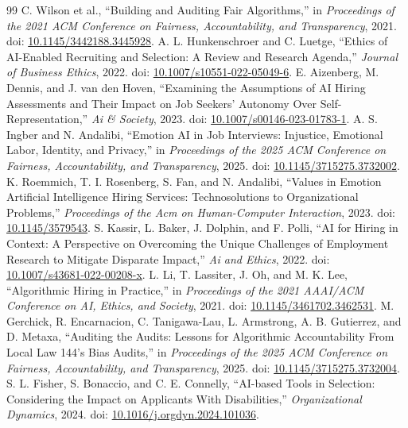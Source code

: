 \documentclass[journal]{IEEEtran}
\begin{document}
\begin{thebibliography}{99}
 C. Wilson et al., ``Building and Auditing Fair Algorithms,'' in \emph{Proceedings of the 2021 ACM Conference on Fairness, Accountability, and Transparency}, 2021. doi: \href{https://doi.org/10.1145/3442188.3445928}{10.1145/3442188.3445928}.
 A. L. Hunkenschroer and C. Luetge, ``Ethics of AI-Enabled Recruiting and Selection: A Review and Research Agenda,'' \emph{Journal of Business Ethics}, 2022. doi: \href{https://doi.org/10.1007/s10551-022-05049-6}{10.1007/s10551-022-05049-6}.
 E. Aizenberg, M. Dennis, and J. van den Hoven, ``Examining the Assumptions of AI Hiring Assessments and Their Impact on Job Seekers' Autonomy Over Self-Representation,'' \emph{Ai \& Society}, 2023. doi: \href{https://doi.org/10.1007/s00146-023-01783-1}{10.1007/s00146-023-01783-1}.
 A. S. Ingber and N. Andalibi, ``Emotion AI in Job Interviews: Injustice, Emotional Labor, Identity, and Privacy,'' in \emph{Proceedings of the 2025 ACM Conference on Fairness, Accountability, and Transparency}, 2025. doi: \href{https://doi.org/10.1145/3715275.3732002}{10.1145/3715275.3732002}.
 K. Roemmich, T. I. Rosenberg, S. Fan, and N. Andalibi, ``Values in Emotion Artificial Intelligence Hiring Services: Technosolutions to Organizational Problems,'' \emph{Proceedings of the Acm on Human-Computer Interaction}, 2023. doi: \href{https://doi.org/10.1145/3579543}{10.1145/3579543}.
 S. Kassir, L. Baker, J. Dolphin, and F. Polli, ``AI for Hiring in Context: A Perspective on Overcoming the Unique Challenges of Employment Research to Mitigate Disparate Impact,'' \emph{Ai and Ethics}, 2022. doi: \href{https://doi.org/10.1007/s43681-022-00208-x}{10.1007/s43681-022-00208-x}.
 L. Li, T. Lassiter, J. Oh, and M. K. Lee, ``Algorithmic Hiring in Practice,'' in \emph{Proceedings of the 2021 AAAI/ACM Conference on AI, Ethics, and Society}, 2021. doi: \href{https://doi.org/10.1145/3461702.3462531}{10.1145/3461702.3462531}.
 M. Gerchick, R. Encarnacion, C. Tanigawa-Lau, L. Armstrong, A. B. Gutierrez, and D. Metaxa, ``Auditing the Audits: Lessons for Algorithmic Accountability From Local Law 144's Bias Audits,'' in \emph{Proceedings of the 2025 ACM Conference on Fairness, Accountability, and Transparency}, 2025. doi: \href{https://doi.org/10.1145/3715275.3732004}{10.1145/3715275.3732004}.
 S. L. Fisher, S. Bonaccio, and C. E. Connelly, ``AI-based Tools in Selection: Considering the Impact on Applicants With Disabilities,'' \emph{Organizational Dynamics}, 2024. doi: \href{https://doi.org/10.1016/j.orgdyn.2024.101036}{10.1016/j.orgdyn.2024.101036}.

\end{thebibliography}
\end{document}
